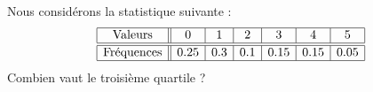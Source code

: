 
\begin{exercice}\label{exosmath-0534}

    Nous considérons la statistique suivante :
    \begin{equation*}
        \begin{array}[]{|c||c|c|c|c|c|c|}
            \hline
            \text{Valeurs}&0&1&2&3&4&5\\
            \hline\hline
            \text{Fréquences}&0.25&0.3&0.1&0.15&0.15&0.05\\
            \hline
        \end{array}
    \end{equation*}
    Combien vaut le troisième quartile ?

\end{exercice}
